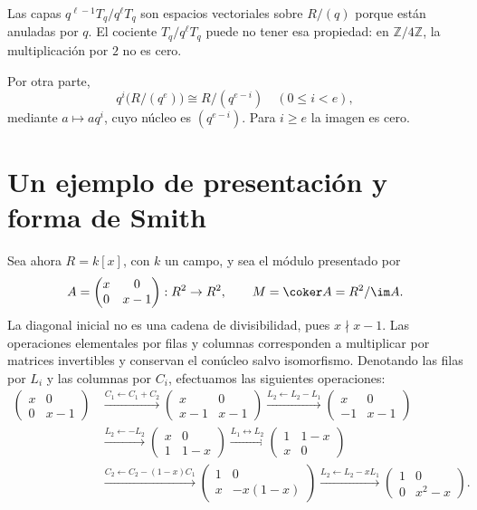 \begin{obs}
Las capas $q^{\ell-1}T_q/q^\ell T_q$ son espacios vectoriales sobre $R/(q)$ porque están anuladas por $q$. El cociente $T_q/q^\ell T_q$ puede no tener esa propiedad: en $\mathbb Z/4\mathbb Z$, la multiplicación por $2$ no es cero.

Por otra parte,
\[
q^i\bigl(R/(q^e)\bigr)\cong R/(q^{e-i})\quad(0\leq i<e),
\]
mediante $a\mapsto aq^i$, cuyo núcleo es $(q^{e-i})$. Para $i\geq e$ la imagen es cero.
\end{obs}

\newpage
\section{Un ejemplo de presentación y forma de Smith}
Sea ahora $R=k[x]$, con $k$ un campo, y sea el módulo presentado por
\[
A=\begin{pmatrix}x&0\\0&x-1\end{pmatrix}:R^2\to R^2,
\qquad M=\coker A=R^2/\im A.
\]
La diagonal inicial no es una cadena de divisibilidad, pues $x\nmid x-1$. Las operaciones elementales por filas y columnas corresponden a multiplicar por matrices invertibles y conservan el conúcleo salvo isomorfismo. Denotando las filas por $L_i$ y las columnas por $C_i$, efectuamos las siguientes operaciones:
\begin{align*}
\begin{pmatrix}x&0\\0&x-1\end{pmatrix}
&\xrightarrow{C_1\leftarrow C_1+C_2}
\begin{pmatrix}x&0\\x-1&x-1\end{pmatrix}
\xrightarrow{L_2\leftarrow L_2-L_1}
\begin{pmatrix}x&0\\-1&x-1\end{pmatrix}\\[3pt]
&\xrightarrow{L_2\leftarrow-L_2}
\begin{pmatrix}x&0\\1&1-x\end{pmatrix}
\xrightarrow{L_1\leftrightarrow L_2}
\begin{pmatrix}1&1-x\\x&0\end{pmatrix}\\[3pt]
&\xrightarrow{C_2\leftarrow C_2-(1-x)C_1}
\begin{pmatrix}1&0\\x&-x(1-x)\end{pmatrix}
\xrightarrow{L_2\leftarrow L_2-xL_1}
\begin{pmatrix}1&0\\0&x^2-x\end{pmatrix}.
\end{align*}
